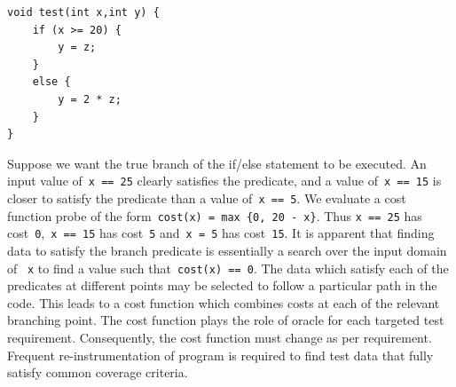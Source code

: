 \begin{lstlisting}
void test(int x,int y) {
	if (x >= 20) {
		y = z; 
	}
	else {
		y = 2 * z;
	}
}
\end{lstlisting}
\bigskip

Suppose we want the true branch of the if/else statement to be executed. An input value of~\verb+x == 25+ clearly satisfies the predicate, and a value of~\verb+x == 15+ is closer to satisfy the predicate than a value of~\verb+x == 5+. We evaluate a cost function probe of the form~\verb+cost(x) = max {0, 20 - x}+. Thus \verb+x == 25+ has cost~\verb+0+,~\verb+x == 15+ has cost~\verb+5+ and~\verb+x = 5+ has cost~\verb+15+. It is apparent that finding data to satisfy the branch predicate is essentially a search over the input domain of ~\verb+x+ to find a value such that~\verb+cost(x) == 0+. The data which satisfy each of the predicates at different points may be selected to follow a particular path in the code. This leads to a cost function which combines costs at each of the relevant branching point. The cost function plays the role of oracle for each targeted test requirement. Consequently, the cost function must change as per requirement. Frequent re-instrumentation of program is required to find test data that fully satisfy common coverage criteria. 







